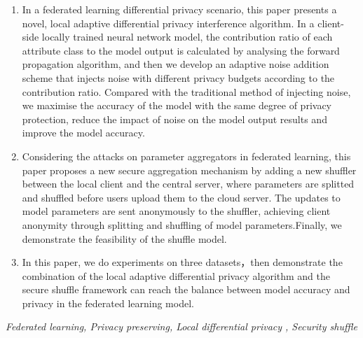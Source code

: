 \begin{enumerate}
	\item In a federated learning differential privacy scenario, this paper presents a novel, local adaptive differential privacy interference algorithm. In a client-side locally trained neural network model, the contribution ratio of each attribute class to the model output is calculated by analysing the forward propagation algorithm, and then we develop an adaptive noise addition scheme that injects noise with different privacy budgets according to the contribution ratio. Compared with the traditional method of injecting noise, we maximise the accuracy of the model with the same degree of privacy protection, reduce the impact of noise on the model output results and improve the model accuracy.
	\item Considering the attacks on parameter aggregators in federated learning, this paper proposes a new secure aggregation mechanism by adding a new shuffler between the local client and the central server, where parameters are splitted and shuffled before users upload them to the cloud server. The updates to model parameters are sent anonymously to the shuffler, achieving client anonymity through splitting and shuffling of model parameters.Finally, we demonstrate the feasibility of the shuffle model.
	\item In this paper, we do experiments on three datasets，then demonstrate the combination of the local adaptive differential privacy algorithm and the secure shuffle framework can reach the balance between model accuracy and privacy in the federated learning model.
\end{enumerate}
{} \textit{Federated learning, Privacy preserving, Local differential privacy , Security shuffle}


